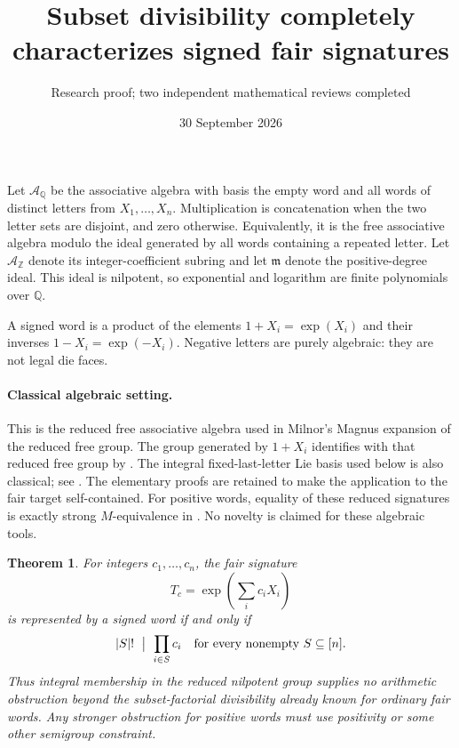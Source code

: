 \documentclass[11pt]{article}
\title{Subset divisibility completely characterizes signed fair signatures}
\author{Research proof; two independent mathematical reviews completed}
\date{30 September 2026}
\newtheorem{theorem}{Theorem}
\newcommand{\A}{\mathcal A}
\begin{document}
\maketitle

Let $\A_{\mathbb Q}$ be the associative algebra with basis the empty word
and all words of distinct letters from $X_1,\ldots,X_n$. Multiplication
is concatenation when the two letter sets are disjoint, and zero
otherwise. Equivalently, it is the free associative algebra modulo the
ideal generated by all words containing a repeated letter.
Let $\A_{\mathbb Z}$ denote its integer-coefficient subring and let
$\mathfrak m$ denote the positive-degree ideal. This ideal is nilpotent,
so exponential and logarithm are finite polynomials over $\mathbb Q$.

A signed word is a product of the elements
$1+X_i=\exp(X_i)$ and their inverses $1-X_i=\exp(-X_i)$.
Negative letters are purely algebraic: they are not legal die faces.

\paragraph{Classical algebraic setting.}
This is the reduced free associative algebra used in Milnor's Magnus
expansion of the reduced free group. The group generated by $1+X_i$
identifies with that reduced free group by
\cite[Theorem~1.12 and Corollary~1.13]{darne}.
The integral fixed-last-letter Lie basis used below is also classical;
see \cite[Lemma~6.15]{darne}. The elementary proofs are retained to
make the application to the fair target self-contained.
For positive words, equality of these reduced signatures is exactly
strong $M$-equivalence in \cite[Theorem~3.3]{teh}.
No novelty is claimed for these algebraic tools.

\begin{theorem}\label{main}
For integers $c_1,\ldots,c_n$, the fair signature
\[
 T_c=\exp\left(\sum_i c_iX_i\right)
\]
is represented by a signed word if and only if
\[
 |S|!\ \bigm|\ \prod_{i\in S}c_i
 \quad\text{for every nonempty }S\subseteq[n].
\]
Thus integral membership in the reduced nilpotent group supplies no
arithmetic obstruction beyond the subset-factorial divisibility already
known for ordinary fair words. Any stronger obstruction for positive words
must use positivity or some other semigroup constraint.
\end{theorem}
\end{document}
